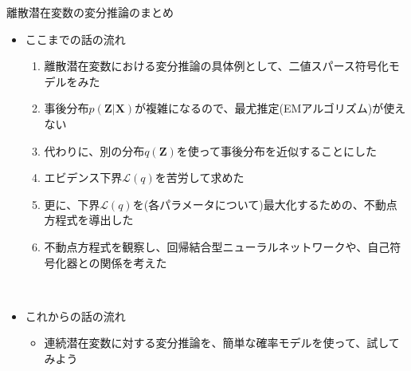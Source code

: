\documentclass[dvipdfmx,notheorems,t]{beamer}
\begin{document}
\begin{frame}{離散潜在変数の変分推論のまとめ}

\begin{itemize}
	\item ここまでの話の流れ
	\begin{enumerate}
		\item 離散潜在変数における変分推論の具体例として、二値スパース符号化モデルをみた
		\newline
		\item 事後分布$p(\bm{Z} | \bm{X})$が複雑になるので、最尤推定(EMアルゴリズム)が使えない
		\item 代わりに、別の分布$q(\bm{Z})$を使って事後分布を近似することにした
		\newline
		\item エビデンス下界$\mathcal{L}(q)$を苦労して求めた
		\item 更に、下界$\mathcal{L}(q)$を(各パラメータについて)最大化するための、不動点方程式を導出した
		\newline
		\item 不動点方程式を観察し、回帰結合型ニューラルネットワークや、自己符号化器との関係を考えた
	\end{enumerate} \
	
	\item これからの話の流れ
	\begin{itemize}
		\item 連続潜在変数に対する変分推論を、簡単な確率モデルを使って、試してみよう
	\end{itemize}
\end{itemize}

\end{frame}
\end{document}
